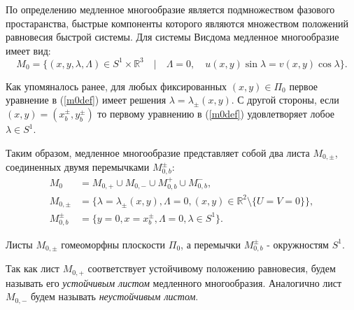 По определению медленное многообразие является подмножеством фазового простаранства, быстрые компоненты которого являются множеством положений равновесия быстрой системы. Для системы Висдома медленное многообразие имеет вид:
\begin{equation}
        M_0 = \{(x, y, \lambda, \Lambda) \in S^1 \times \mathbb{R}^3 \quad | \quad \Lambda = 0, \quad u(x,y) \sin \lambda = v(x,y) \cos \lambda \}.
        \label{m0def}
\end{equation}

Как упомяналось ранее, для любых фиксированных $(x,y) \in \Pi_0$ первое уравнение в (\ref{m0def}) имеет решения $\lambda = \lambda_\pm(x,y)$.
С другой стороны, если $(x,y) = (x_b^\pm, y_b^\pm)$ то первому уравнению в (\ref{m0def}) удовлетворяет лобое $\lambda \in S^1$.

Таким образом, медленное многообразие представляет собой два листа $M_{0,\pm}$, соединенных двумя перемычками $M_{0,b}^{\pm}$:
\begin{align*}
M_0 &= M_{0,+} \cup M_{0,-} \cup M_{0,b}^{+} \cup M_{0,b}^{-}, \\
M_{0,\pm} &= \{ \lambda = \lambda_{\pm}(x,y), \Lambda = 0, (x,y) \in \mathbb{R}^2 \setminus \{U=V=0\} \}, \\
M_{0,b}^{\pm} &= \{ y=0, x=x_b^{\pm}, \Lambda=0, \lambda\in S^1 \}.
\end{align*}

Листы $M_{0,\pm}$ гомеоморфны плоскости $\Pi_0$, а перемычки $M_{0,b}^{\pm}$ - окружностям $S^1$.

Так как лист $M_{0,+}$ соответствует устойчивому положению равновесия, будем называть его \textit{устойчивым листом} медленного многообразия. Аналогично лист $M_{0,-}$ будем называть \textit{неустойчивым листом}.